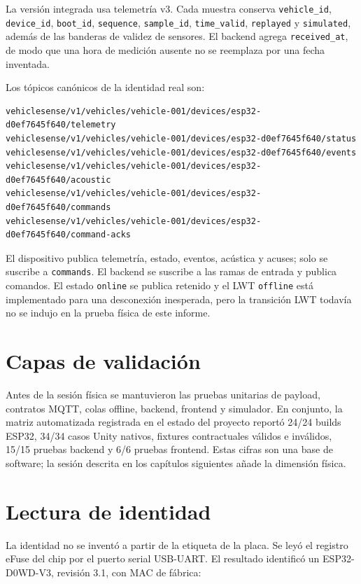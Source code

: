 \documentclass[10pt,a4paper]{article}
\newcommand{\code}[1]{\texttt{\small #1}}
\begin{document}
La versión integrada usa telemetría v3. Cada muestra conserva
\code{vehicle\_id}, \code{device\_id}, \code{boot\_id}, \code{sequence},
\code{sample\_id}, \code{time\_valid}, \code{replayed} y \code{simulated},
además de las banderas de validez de sensores. El backend agrega
\code{received\_at}, de modo que una hora de medición ausente no se reemplaza
por una fecha inventada.

Los tópicos canónicos de la identidad real son:

\begin{lstlisting}
vehiclesense/v1/vehicles/vehicle-001/devices/esp32-d0ef7645f640/telemetry
vehiclesense/v1/vehicles/vehicle-001/devices/esp32-d0ef7645f640/status
vehiclesense/v1/vehicles/vehicle-001/devices/esp32-d0ef7645f640/events
vehiclesense/v1/vehicles/vehicle-001/devices/esp32-d0ef7645f640/acoustic
vehiclesense/v1/vehicles/vehicle-001/devices/esp32-d0ef7645f640/commands
vehiclesense/v1/vehicles/vehicle-001/devices/esp32-d0ef7645f640/command-acks
\end{lstlisting}

El dispositivo publica telemetría, estado, eventos, acústica y acuses; solo se
suscribe a \code{commands}. El backend se suscribe a las ramas de entrada y
publica comandos. El estado \code{online} se publica retenido y el LWT
\code{offline} está implementado para una desconexión inesperada, pero la
transición LWT todavía no se indujo en la prueba física de este informe.

\section{Capas de validación}

Antes de la sesión física se mantuvieron las pruebas unitarias de payload,
contratos MQTT, colas offline, backend, frontend y simulador. En conjunto, la
matriz automatizada registrada en el estado del proyecto reportó 24/24 builds
ESP32, 34/34 casos Unity nativos, fixtures contractuales válidos e inválidos,
15/15 pruebas backend y 6/6 pruebas frontend. Estas cifras son una base de
software; la sesión descrita en los capítulos siguientes añade la dimensión
física.

\section{Lectura de identidad}

La identidad no se inventó a partir de la etiqueta de la placa. Se leyó el
registro eFuse del chip por el puerto serial USB-UART. El resultado identificó un
ESP32-D0WD-V3, revisión 3.1, con MAC de fábrica:
\end{document}
